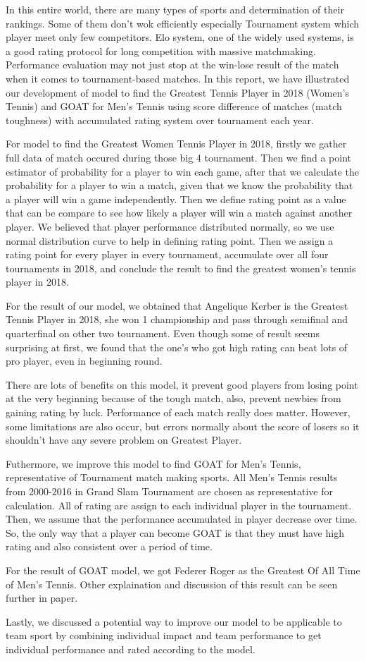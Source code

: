 In this entire world, there are many types of sports and determination of their rankings. Some of them don't wok efficiently especially Tournament system which player meet only few competitors. Elo system, one of the widely used systems, is a good rating protocol for long competition with massive matchmaking. Performance evaluation may not just stop at the win-lose result of the match when it comes to tournament-based matches. In this report, we have illustrated our development of model to find the Greatest Tennis Player in 2018 (Women's Tennis) and GOAT for Men's Tennis using score difference of matches (match toughness) with accumulated rating system over tournament each year.

For model to find the Greatest Women Tennis Player in 2018, firstly we gather full data of match occured during those big 4 tournament. Then we find a point estimator of probability for a player to win each game, after that we calculate the probability for a player to win a match, given that we know the probability that a player will win a game independently. Then we define rating point as a value that can be compare to see how likely a player will win a match against another player. We believed that player performance distributed normally, so we use normal distribution curve to help in defining rating point. Then we assign a rating point for every player in every tournament, accumulate over all four tournaments in 2018, and conclude the result to find the greatest women's tennis player in 2018.

For the result of our model, we obtained that Angelique Kerber is the Greatest Tennis Player in 2018, she won 1 championship and pass through semifinal and quarterfinal on other two tournament. Even though some of result seems surprising at first, we found that the one's who got high rating can beat lots of pro player, even in beginning round. 

There are lots of benefits on this model, it prevent good players from losing point at the very beginning because of the tough match, also, prevent newbies from gaining rating by luck. Performance of each match really does matter. However, some limitations are also occur, but errors normally about the score of losers so it shouldn't have any severe problem on Greatest Player.

Futhermore, we improve this model to find GOAT for Men's Tennis, representative of Tournament match making sports. All Men's Tennis results from 2000-2016 in Grand Slam Tournament are chosen as representative for calculation. All of rating are assign to each individual player in the tournament. Then, we assume that the performance accumulated in player decrease over time. So, the only way that a player can become GOAT is that they must have high rating and also consistent over a period of time.

For the result of GOAT model, we got Federer Roger as the Greatest Of All Time of Men's Tennis. Other explaination and discussion of this result can be seen further in paper. 

Lastly, we discussed a potential way to improve our model to be applicable to team sport by combining individual impact and team performance to get individual performance and rated according to the model.
